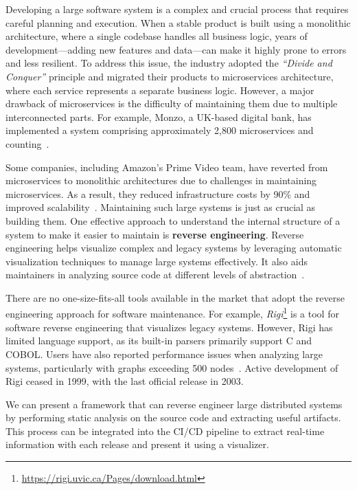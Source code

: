 Developing a large software system is a complex and crucial process that requires careful planning and execution. When a stable product is built using a monolithic architecture, where a single codebase handles all business logic, years of development—adding new features and data—can make it highly prone to errors and less resilient. To address this issue, the industry adopted the \textit{``Divide and Conquer''} principle and migrated their products to microservices architecture, where each service represents a separate business logic. However, a major drawback of microservices is the difficulty of maintaining them due to multiple interconnected parts. For example, Monzo, a UK-based digital bank, has implemented a system comprising approximately 2,800 microservices and counting~\citep{monzoMicroservices}.

Some companies, including Amazon's Prime Video team, have reverted from microservices to monolithic architectures due to challenges in maintaining microservices. As a result, they reduced infrastructure costs by 90\% and improved scalability~\citep{anderson2023microservices}. Maintaining such large systems is just as crucial as building them. One effective approach to understand the internal structure of a system to make it easier to maintain is \textbf{reverse engineering}. Reverse engineering helps visualize complex and legacy systems by leveraging automatic visualization techniques to manage large systems effectively. It also aids maintainers in analyzing source code at different levels of abstraction~\citep{SVInSoftwareMaintenanceRainer}.

There are no one-size-fits-all tools available in the market that adopt the reverse engineering approach for software maintenance. For example, \textit{Rigi}\footnote{\url{https://rigi.uvic.ca/Pages/download.html}} is a tool for software reverse engineering that visualizes legacy systems. However, Rigi has limited language support, as its built-in parsers primarily support C and COBOL. Users have also reported performance issues when analyzing large systems, particularly with graphs exceeding 500 nodes~\citep{Koschke2002}. Active development of Rigi ceased in 1999, with the last official release in 2003. 

We can present a framework that can reverse engineer large distributed systems by performing static analysis on the source code and extracting useful artifacts. This process can be integrated into the CI/CD pipeline to extract real-time information with each release and present it using a visualizer. 

